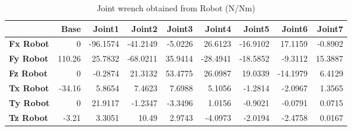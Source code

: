 \begin{table}[h!]
	\centering
	\caption{Joint wrench obtained from Robot (N/Nm)}
	\label{wrech_Robot_Pose9}
	\begin{tabular}{|l|r|r|r|r|r|r|r|r|}
		\hline
		\textbf{} & \textbf{Base} & \textbf{Joint1}  & \textbf{Joint2}  & \textbf{Joint3}  & \textbf{Joint4}  & \textbf{Joint5}  & \textbf{Joint6}  & \textbf{Joint7} \\ \hline
		\textbf{Fx Robot}  & 0        & -96.1574        & -41.2149        & -5.0226        & 26.6123        & -16.9102        & 17.1159        & -0.8902 \\ \hline
		\textbf{Fy Robot}  & 110.26        & 25.7832        & -68.0211        & 35.9414        & -28.4941        & -18.5852        & -9.3112        & 15.3887 \\ \hline
		\textbf{Fz Robot}  & 0        & -0.2874        & 21.3132        & 53.4775        & 26.0987        & 19.0339        & -14.1979        & 6.4129 \\ \hline
		\textbf{Tx Robot}  & -34.16        & 5.8654        & 7.4623        & 7.6988        & 5.1056        & -1.2814        & -2.0967        & 1.3565 \\ \hline
		\textbf{Ty Robot}  & 0        & 21.9117        & -1.2347        & -3.3496        & 1.0156        & -0.9021        & -0.0791        & 0.0715 \\ \hline
		\textbf{Tz Robot}  & -3.21        & 3.3051        & 10.49        & 2.9743        & -4.0973        & -2.0194        & -2.4758        & 0.0167 \\ \hline
	\end{tabular}
\end{table}

